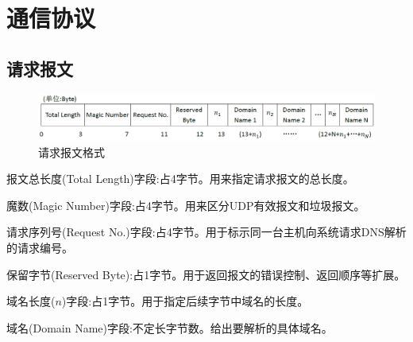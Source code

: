 %
%
%
\section{通信协议}
\subsection{请求报文}
\begin{figure}[H]
\centering
\includegraphics[keepaspectratio, scale=0.4]{pitures/request.png}
\caption{请求报文格式}
\end{figure}
	\begin{asparaitem}
		\item{报文总长度(Total Length)字段:占4字节。用来指定请求报文的总长度。}
		\item{魔数(Magic Number)字段:占4字节。用来区分UDP有效报文和垃圾报文。}
		\item{请求序列号(Request No.)字段:占4字节。用于标示同一台主机向系统请求DNS解析的请求编号。}
		\item{保留字节(Reserved Byte):占1字节。用于返回报文的错误控制、返回顺序等扩展。}
		\item{域名长度($n$)字段:占1字节。用于指定后续字节中域名的长度。}
		\item{域名(Domain Name)字段:不定长字节数。给出要解析的具体域名。}
	\end{asparaitem}

